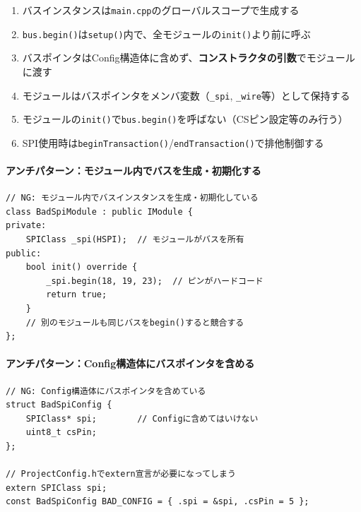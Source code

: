 \begin{notebox}[通信バスパターンのルール]
\begin{enumerate}
    \item バスインスタンスは\texttt{main.cpp}のグローバルスコープで生成する
    \item \texttt{bus.begin()}は\texttt{setup()}内で、全モジュールの\texttt{init()}より前に呼ぶ
    \item バスポインタはConfig構造体に含めず、\textbf{コンストラクタの引数}でモジュールに渡す
    \item モジュールはバスポインタをメンバ変数（\texttt{\_spi}, \texttt{\_wire}等）として保持する
    \item モジュールの\texttt{init()}で\texttt{bus.begin()}を呼ばない（CSピン設定等のみ行う）
    \item SPI使用時は\texttt{beginTransaction()}/\texttt{endTransaction()}で排他制御する
\end{enumerate}
\end{notebox}

\paragraph{アンチパターン：モジュール内でバスを生成・初期化する}

\begin{lstlisting}[style=cppstyle, caption={アンチパターン：モジュール内でバスを生成（禁止）}]
// NG: モジュール内でバスインスタンスを生成・初期化している
class BadSpiModule : public IModule {
private:
    SPIClass _spi(HSPI);  // モジュールがバスを所有
public:
    bool init() override {
        _spi.begin(18, 19, 23);  // ピンがハードコード
        return true;
    }
    // 別のモジュールも同じバスをbegin()すると競合する
};
\end{lstlisting}

\paragraph{アンチパターン：Config構造体にバスポインタを含める}

\begin{lstlisting}[style=cppstyle, caption={アンチパターン：Configにバスポインタ（禁止）}]
// NG: Config構造体にバスポインタを含めている
struct BadSpiConfig {
    SPIClass* spi;        // Configに含めてはいけない
    uint8_t csPin;
};

// ProjectConfig.hでextern宣言が必要になってしまう
extern SPIClass spi;
const BadSpiConfig BAD_CONFIG = { .spi = &spi, .csPin = 5 };
\end{lstlisting}

